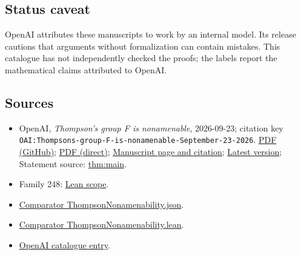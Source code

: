 \documentclass[11pt]{article}
\begin{document}
\subsection{Status caveat}
OpenAI attributes these manuscripts to work by an internal model. Its release cautions that arguments without formalization can contain mistakes. This catalogue has not independently checked the proofs; the labels report the mathematical claims attributed to OpenAI.

\subsection{Sources}
\begin{itemize}
\item OpenAI, \emph{Thompson's group F is nonamenable}, 2026-09-23; citation key \texttt{OAI:Thompsons-group-F-is-nonamenable-September-23-2026}. \href{https://github.com/openai/math/blob/adc7f1241b42e322a6451854ab7e4b4c146bf78a/preprints/Thompsons-group-F-is-nonamenable-September-23-2026/paper.pdf}{PDF (GitHub)}; \href{https://github.com/openai/math/raw/adc7f1241b42e322a6451854ab7e4b4c146bf78a/preprints/Thompsons-group-F-is-nonamenable-September-23-2026/paper.pdf}{PDF (direct)}; \href{https://github.com/openai/math/blob/adc7f1241b42e322a6451854ab7e4b4c146bf78a/preprints/Thompsons-group-F-is-nonamenable-September-23-2026/README.md}{Manuscript page and citation}; \href{https://github.com/openai/math/blob/main/preprints/Thompsons-group-F-is-nonamenable-September-23-2026/paper.pdf}{Latest version}; Statement source: \href{https://github.com/openai/math/blob/adc7f1241b42e322a6451854ab7e4b4c146bf78a/preprints/Thompsons-group-F-is-nonamenable-September-23-2026/build/sections/introduction.tex\#L37}{thm:main}.
\item Family 248: \href{https://github.com/openai/math/blob/adc7f1241b42e322a6451854ab7e4b4c146bf78a/lean/docs/248.md}{Lean scope}.
\item \href{https://github.com/openai/math/blob/adc7f1241b42e322a6451854ab7e4b4c146bf78a/lean/ComparatorChallenges/ThompsonNonamenability.json}{Comparator ThompsonNonamenability.json}.
\item \href{https://github.com/openai/math/blob/adc7f1241b42e322a6451854ab7e4b4c146bf78a/lean/ComparatorChallenges/ThompsonNonamenability.lean}{Comparator ThompsonNonamenability.lean}.
\item \href{https://github.com/openai/math/blob/adc7f1241b42e322a6451854ab7e4b4c146bf78a/CONTENTS.md}{OpenAI catalogue entry}.
\end{itemize}
\end{document}
